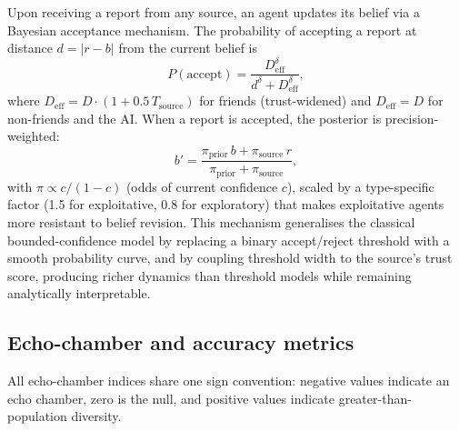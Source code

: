 \documentclass[pdflatex,sn-nature]{sn-jnl}
\begin{document}
Upon receiving a report from any source, an agent updates its belief via a Bayesian acceptance mechanism. The probability of accepting a report at distance $d = |r - b|$ from the current belief is
\begin{equation}
P(\text{accept}) = \frac{D_{\text{eff}}^{\delta}}{d^{\delta} + D_{\text{eff}}^{\delta}},
\label{eq:accept}
\end{equation}
where $D_{\text{eff}} = D \cdot (1 + 0.5\, T_{\text{source}})$ for friends (trust-widened) and $D_{\text{eff}} = D$ for non-friends and the AI. When a report is accepted, the posterior is precision-weighted:
\begin{equation}
b' = \frac{\pi_{\text{prior}}\, b + \pi_{\text{source}}\, r}{\pi_{\text{prior}} + \pi_{\text{source}}},
\label{eq:posterior}
\end{equation}
with $\pi \propto c/(1-c)$ (odds of current confidence $c$), scaled by a type-specific factor (1.5 for exploitative, 0.8 for exploratory) that makes exploitative agents more resistant to belief revision. This mechanism generalises the classical bounded-confidence model \citep{deffuant2000mixing} by replacing a binary accept/reject threshold with a smooth probability curve, and by coupling threshold width to the source's trust score, producing richer dynamics than threshold models while remaining analytically interpretable.

\subsection{Echo-chamber and accuracy metrics}\label{sec:metrics}

All echo-chamber indices share one sign convention: negative values indicate an echo chamber, zero is the null, and positive values indicate greater-than-population diversity.
\end{document}
